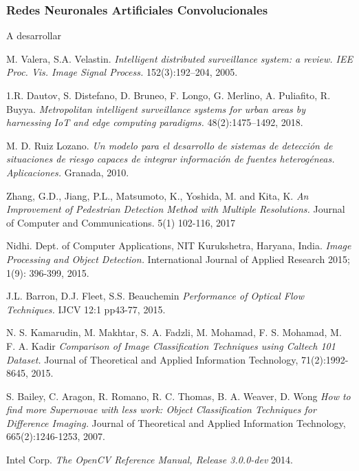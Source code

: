 \documentclass[a4paper,12pt,twoside]{article}
\begin{document}
\subsubsection{Redes Neuronales Artificiales Convolucionales}

A desarrollar
















	
\newpage	
\begin{thebibliography}{9}
	M. Valera, S.A. Velastin. \textit{Intelligent distributed surveillance system: a review. IEE Proc. Vis. Image Signal Process.} 152(3):192–204, 2005.
	
	1.R. Dautov, S. Distefano, D. Bruneo, F. Longo, G. Merlino, A. Puliafito, R. Buyya. \textit{Metropolitan intelligent surveillance systems for urban areas by harnessing IoT and edge computing paradigms.} 48(2):1475–1492, 2018.

	M. D. Ruiz Lozano. \textit{Un modelo para el desarrollo de sistemas de detección de situaciones de riesgo capaces de integrar información de fuentes heterogéneas. Aplicaciones.} Granada, 2010.

	Zhang, G.D., Jiang, P.L., Matsumoto, K., Yoshida, M. and Kita, K. \textit{An Improvement of Pedestrian Detection Method with Multiple Resolutions.} Journal of Computer and Communications. 5(1) 102-116, 2017

	Nidhi. Dept. of Computer Applications, NIT Kurukshetra, Haryana, India. \textit{Image Processing and Object Detection.} International Journal of Applied Research 2015; 1(9): 396-399, 2015.
	
	J.L. Barron, D.J. Fleet, S.S. Beauchemin \textit{Performance of Optical Flow Techniques.} IJCV 12:1 pp43-77, 2015.
	
	N. S. Kamarudin, M. Makhtar, S. A. Fadzli, M. Mohamad, F. S. Mohamad, M. F. A. 
	Kadir \textit{Comparison of Image Classification Techniques using Caltech 101 Dataset.} Journal of Theoretical and Applied Information Technology, 71(2):1992-8645, 2015.
	
	S. Bailey, C. Aragon, R. Romano, R. C. Thomas, B. A. Weaver, D. Wong \textit{How to find more Supernovae with less work: Object Classification Techniques for Difference Imaging.} Journal of Theoretical and Applied Information Technology, 665(2):1246-1253, 2007.	
	
	Intel Corp. \textit{The OpenCV Reference Manual, Release 3.0.0-dev} 2014.	
	
	
	
\end{thebibliography}
\end{document}
